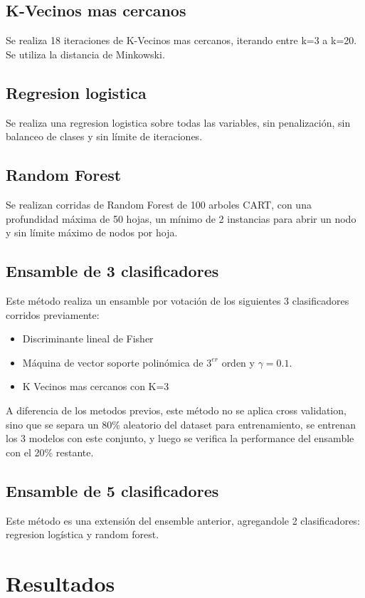 \documentclass[journal]{IEEEtran}
\begin{document}
\subsection{K-Vecinos mas cercanos}
Se realiza 18 iteraciones de K-Vecinos mas cercanos, iterando entre k=3
a k=20. Se utiliza la distancia de Minkowski.

\subsection{Regresion logistica}
Se realiza una regresion logistica sobre todas las variables, sin penalización,
sin balanceo de clases y sin límite de iteraciones.

\subsection{Random Forest}
Se realizan corridas de Random Forest de 100 arboles CART, con una 
profundidad máxima de 50 hojas, un mínimo de 2 instancias para abrir
un nodo y sin límite máximo de nodos por hoja.

\subsection{Ensamble de 3 clasificadores}
Este método realiza un ensamble por votación de los siguientes 3
clasificadores corridos previamente:

\begin{itemize}
\item Discriminante lineal de Fisher
\item Máquina de vector soporte polinómica de $3^{er}$ orden y $\gamma=0.1$. 
\item K Vecinos mas cercanos con K=3
\end{itemize}

A diferencia de los metodos previos, este método no se aplica
cross validation, sino que se separa un 80\% aleatorio del dataset para 
entrenamiento, se entrenan los 3 modelos con este conjunto, y luego
se verifica la performance del ensamble con el 20\% restante.

\subsection{Ensamble de 5 clasificadores}
Este método es una extensión del ensemble anterior, agregandole
2 clasificadores: regresion logística y random forest.

\section{Resultados}
\end{document}
